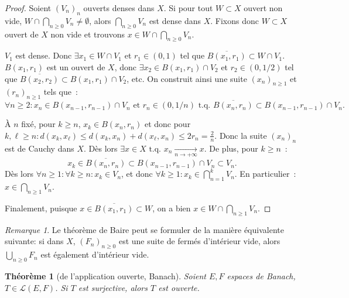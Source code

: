 \documentclass{report}
\newcommand{\tq}{\text{ t.q. }}
\newcommand{\st}{\tq}
\newcommand{\pinfty}{{+\infty}}
\newtheorem{thm}{Théorème}[chapter]
\theoremstyle{definition}
\theoremstyle{remark}
\newtheorem*{rmq}{Remarque}
\begin{document}
\begin{proof} Soient $(V_n)_n$ ouverts denses dans $X$. Si pour tout $W \subset X$ ouvert non vide, $W \cap \bigcap_{n \geq 0}V_n \neq \emptyset$, alors $\bigcap_{n \geq 0}V_n$
est dense dans $X$. Fixons donc $W \subset X$ ouvert de $X$ non vide et trouvons $x \in W \cap \bigcap_{n \geq 0}V_n$.

$V_1$ est dense. Donc $\exists x_1 \in W \cap V_1$ et $r_1 \in (0, 1)$ tel que $\overline {B(x_1, r_1)} \subset W \cap V_1$. $B(x_1, r_1)$ est un ouvert de $X$, donc
$\exists x_2 \in B(x_1, r_1) \cap V_2$ et $r_2 \in (0, 1/2)$ tel que $\overline {B(x_2, r_2)} \subset B(x_1, r_1) \cap V_2$, etc. On construit ainsi une suite $(x_n)_{n \geq 1}$
et $(r_n)_{n \geq 1}$ tels que~:
\[\forall n \geq 2 : x_n \in B(x_{n-1}, r_{n-1}) \cap V_n \text{ et } r_n \in (0, 1/n) \st \overline {B(x_n, r_n)} \subset B(x_{n-1}, r_{n-1}) \cap V_n.\]

À $n$ fixé, pour $k \geq n$, $x_k \in B(x_n, r_n)$ et donc pour $k, \ell \geq n : d(x_k, x_\ell) \leq d(x_k, x_n) + d(x_\ell, x_n) \leq 2r_n = \frac 2n$.
Donc la suite $(x_n)_n$ est de Cauchy dans $X$. Dès lors $\exists x \in X \st x_n \xrightarrow[n \to \pinfty]{} x$. De plus, pour $k \geq n$~:
\[x_k \in \overline {B(x_n, r_n)} \subset B(x_{n-1}, r_{n-1}) \cap V_n \subset V_n.\]
Dès lors $\forall n \geq 1 : \forall k \geq n : x_k \in V_n$, et donc $\forall k \geq 1 : x_k \in \bigcap_{n=1}^kV_n$. En particulier~: $x \in \bigcap_{n \geq 1}V_n$.

Finalement, puisque $x \in \overline {B(x_1, r_1)} \subset W$, on a bien $x \in W \cap \bigcap_{n \geq 1}V_n$.
\end{proof}

\begin{rmq} Le théorème de Baire peut se formuler de la manière équivalente suivante: si dans $X$, $(F_n)_{n \geq 0}$ est une suite de fermés d'intérieur vide,
alors $\bigcup_{n \geq 0}F_n$ est également d'intérieur vide.
\end{rmq}

\begin{thm}[de l'application ouverte, Banach] Soient $E, F$ espaces de Banach, $T \in \mathcal L(E, F)$. Si $T$ est surjective, alors $T$ est ouverte.
\end{thm}
\end{document}
